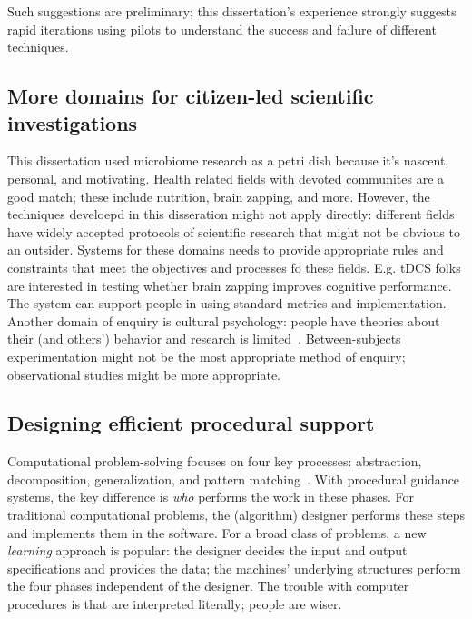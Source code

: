 Such suggestions are preliminary; this dissertation's experience strongly suggests rapid iterations using pilots to understand the success and failure of different techniques. 

\subsection{More domains for citizen-led scientific investigations}
This dissertation used microbiome research as a petri dish because it’s nascent, personal, and motivating. Health related fields with devoted communites are a good match; these include nutrition, brain zapping, and more. However, the techniques develoepd in this disseration might not apply directly: different fields have widely accepted protocols of scientific research that might not be obvious to an outsider. Systems for these domains needs to provide appropriate rules and constraints that meet the objectives and processes fo these fields. E.g. tDCS folks are interested in testing whether brain zapping improves cognitive performance. The system can support people in using standard metrics and implementation. Another domain of enquiry is cultural psychology: people have theories about their (and others') behavior and research is limited~\cite{Henrich2010a}. Between-subjects experimentation might not be the most appropriate method of enquiry; observational studies might be more appropriate.

\subsection{Designing efficient procedural support}

Computational problem-solving focuses on four key processes: abstraction, decomposition, generalization, and pattern matching~\cite{Wing2006}. With procedural guidance systems, the key difference is \textit{who} performs the work in these phases. For traditional computational problems, the (algorithm) designer performs these steps and implements them in the software. For a broad class of problems, a new \textit{learning} approach is popular: the designer decides the input and output specifications and provides the data; the machines' underlying structures perform the four phases independent of the designer. The trouble with computer procedures is that are interpreted literally; people are wiser. 

